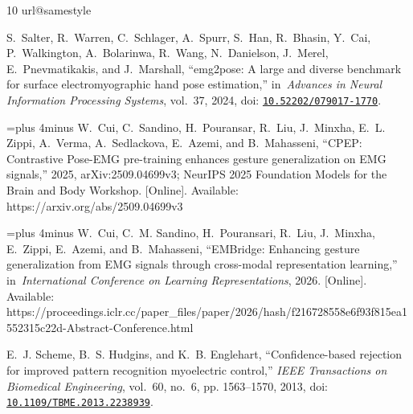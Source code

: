 \documentclass[conference,letterpaper]{IEEEtran}
\begin{document}
\clearpage
{}
\begin{thebibliography}{10}
\providecommand{\url}[1]{#1}
\csname url@samestyle\endcsname
\providecommand{\newblock}{\relax}
\providecommand{\bibinfo}[2]{#2}
\providecommand{\BIBentrySTDinterwordspacing}{\spaceskip=0pt\relax}
\providecommand{\BIBentryALTinterwordstretchfactor}{4}
\providecommand{\BIBentryALTinterwordspacing}{\spaceskip=\fontdimen2\font plus
\BIBentryALTinterwordstretchfactor\fontdimen3\font minus
  \fontdimen4\font\relax}
\providecommand{\BIBforeignlanguage}[2]{{%
\expandafter\ifx\csname l@#1\endcsname\relax
\typeout{** WARNING: IEEEtran.bst: No hyphenation pattern has been}%
\typeout{** loaded for the language `#1'. Using the pattern for}%
\typeout{** the default language instead.}%
\else
\language=\csname l@#1\endcsname
\fi
#2}}
\providecommand{\BIBdecl}{\relax}
\BIBdecl

S.~Salter, R.~Warren, C.~Schlager, A.~Spurr, S.~Han, R.~Bhasin, Y.~Cai,
  P.~Walkington, A.~Bolarinwa, R.~Wang, N.~Danielson, J.~Merel,
  E.~Pnevmatikakis, and J.~Marshall, ``{emg2pose}: A large and diverse
  benchmark for surface electromyographic hand pose estimation,''
  in~\emph{Advances in Neural Information Processing Systems}, vol.~37, 2024,
  doi:
  \href{https://doi.org/10.52202/079017-1770}{\nolinkurl{10.52202/079017-1770}}.

\BIBentryALTinterwordspacing
W.~Cui, C.~Sandino, H.~Pouransar, R.~Liu, J.~Minxha, E.~L. Zippi, A.~Verma,
  A.~Sedlackova, E.~Azemi, and B.~Mahasseni, ``{CPEP}: Contrastive {Pose-EMG}
  pre-training enhances gesture generalization on {EMG} signals,'' 2025,
  arXiv:2509.04699v3; NeurIPS 2025 Foundation Models for the Brain and Body
  Workshop. [Online]. Available: \url{https://arxiv.org/abs/2509.04699v3}
\BIBentrySTDinterwordspacing

\BIBentryALTinterwordspacing
W.~Cui, C.~M. Sandino, H.~Pouransari, R.~Liu, J.~Minxha, E.~Zippi, E.~Azemi,
  and B.~Mahasseni, ``{EMBridge}: Enhancing gesture generalization from {EMG}
  signals through cross-modal representation learning,'' in~\emph{International
  Conference on Learning Representations}, 2026. [Online]. Available:
  \url{https://proceedings.iclr.cc/paper_files/paper/2026/hash/f216728558e6f93f815ea1552315c22d-Abstract-Conference.html}
\BIBentrySTDinterwordspacing

E.~J. Scheme, B.~S. Hudgins, and K.~B. Englehart, ``Confidence-based rejection
  for improved pattern recognition myoelectric control,'' \emph{IEEE
  Transactions on Biomedical Engineering}, vol.~60, no.~6, pp. 1563--1570,
  2013, doi:
  \href{https://doi.org/10.1109/TBME.2013.2238939}{\nolinkurl{10.1109/TBME.2013.2238939}}.


\end{thebibliography}
\end{document}
